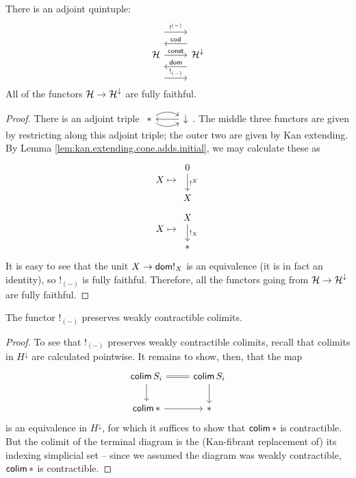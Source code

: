 \begin{prop}
  There is an adjoint quintuple:
  \[
    \begin{tikzcd}
      \Ha \arrow[r, "\const"] \arrow[r, leftarrow, shift left = 5,
      "\term{cod}"] \arrow[r, leftarrow, shift right = 5, "\term{dom}"]
      \arrow[r, shift left = 10, "!^{(-)}"]  \arrow[r, shift right = 10, "!_{(-)}"] & \Ha^{\downarrow}
    \end{tikzcd}
  \]
  All of the functors $\operatorname{\mathcal{H}} \to \operatorname{\mathcal{H}}^{\downarrow}$ are fully faithful.
\end{prop}
\begin{proof}
There is an adjoint triple $\begin{tikzcd} \ast \arrow[r,leftarrow] \arrow[r,
  bend left] \arrow[r, bend right] & \downarrow \end{tikzcd}$. The middle three
functors are given by restricting along this adjoint triple; the outer two are
given by Kan extending. By Lemma \ref{lem:kan.extending.cone.adds.initial}, we
may calculate these as
  $$X \mapsto \begin{tikzcd} 0 \arrow[d, "!^X"] \\ X \end{tikzcd}$$
  $$X \mapsto \begin{tikzcd} X \arrow[d, "!_X"] \\ \ast \end{tikzcd}$$
It is easy to see that the unit $X \to \mathsf{{dom}} !_{X}$ is an equivalence (it is in
fact an identity), so $!_{(-)}$ is fully faithful. Therefore, all the functors
going from $\operatorname{\mathcal{H}} \to \operatorname{\mathcal{H}}^{\downarrow}$ are fully faithful.
\end{proof}


\begin{prop}\label{lem:bang.preserves.weakly.contractible.colimits}
  The functor $!_{(-)}$ preserves weakly contractible colimits.
\end{prop}
\begin{proof}
  To see that $!_{(-)}$ preserves weakly contractible colimits, recall that colimits in $H^{\downarrow}$ are calculated pointwise. It remains to show, then, that the map
  \[
    \begin{tikzcd}
    \colim S_i \arrow[r, equals] \arrow[d] & \colim S_i \arrow[d] \\
    \colim \ast \arrow[r] & \ast 
    \end{tikzcd}
  \]
  is an equivalence in $H^{\downarrow}$, for which it suffices to show that $\operatorname{\mathsf{colim}} \ast$ is contractible. But the colimit of the terminal diagram is the (Kan-fibrant replacement of) its indexing simplicial set -- since we assumed the diagram was weakly contractible, $\operatorname{\mathsf{colim}} \ast$ is contractible.
\end{proof}



